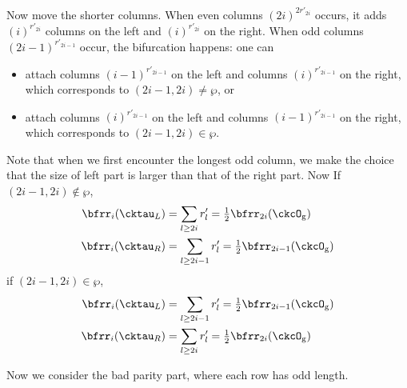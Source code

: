 \documentclass[12pt]{amsart}
\def\abs#1{\left|{#1}\right|}
\newcommand{\sgn}{\operatorname{sgn}}
\numberwithin{equation}{section}
\theoremstyle{remark}
\def\half{{\tfrac{1}{2}}}
\begin{document}
{{      Now move the shorter columns. When even columns $(2i)^{2r'_{2i}}$
      occurs, it adds $(i)^{r'_{2i}}$ columns on the left and $(i)^{r'_{2i}}$ on
      the right. When odd columns $(2i-1)^{r'_{2i-1}}$ occur, the bifurcation
      happens: one can
      \begin{itemize}
        \item attach columns $(i-1)^{r'_{2i-1}}$ on the left and columns
              $(i)^{r'_{2i-1}}$ on the right, which corresponds to
              $(2i-1,2i)\neq \wp$, or
        \item attach columns $(i)^{r'_{2i-1}}$ on the left and columns
              $(i-1)^{r'_{2i-1}}$ on the right, which corresponds to
              $(2i-1,2i)\in \wp$.
      \end{itemize}
      Note that when we first encounter the longest odd column, we make the
      choice that the size of left part is larger than that of the right part.
      Now If $(2i-1,2i)\notin \wp$,
      \[
        \begin{split}
          \bfrr_{i}(\cktau_{L}) & = \sum_{l\geq 2i} r'_{l}
          = \half\bfrr_{2i}(\ckcO_{\mathrm g})\\
          \bfrr_{i}(\cktau_{R}) & = \sum_{l\geq 2i-1} r'_{l} = \half\bfrr_{2i-1}(\ckcO_{\mathrm g})
        \end{split}
      \]
      if $(2i-1,2i)\in \wp$,
      \[
        \begin{split}
          \bfrr_{i}(\cktau_{L}) & = \sum_{l\geq 2i-1} r'_{l}
          = \half\bfrr_{2i-1}(\ckcO_{\mathrm g})\\
          \bfrr_{i}(\cktau_{R}) & = \sum_{l\geq 2i} r'_{l} = \half\bfrr_{2i}(\ckcO_{\mathrm g})
        \end{split}
      \]
    }


    Now we consider the bad parity part, where each row has
    odd length.



}
\end{document}
